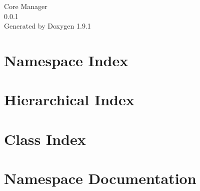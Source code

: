 \let\mypdfximage\pdfximage\def\pdfximage{\immediate\mypdfximage}\documentclass[twoside]{book}
\newcommand{\+}{\discretionary{\mbox{\scriptsize$\hookleftarrow$}}{}{}}
\newcommand{\clearemptydoublepage}{%
  \newpage{\pagestyle{empty}\cleardoublepage}%
}
\begin{document}
\raggedbottom

\begin{titlepage}
\vspace*{7cm}
\begin{center}%
{\Large Core Manager \\[1ex]\large 0.\+0.\+1 }\\
\vspace*{1cm}
{\large Generated by Doxygen 1.9.1}\\
\end{center}
\end{titlepage}
\clearemptydoublepage
{}
\tableofcontents
\clearemptydoublepage
{}

\chapter{Namespace Index}

\chapter{Hierarchical Index}

\chapter{Class Index}

\chapter{Namespace Documentation}































\end{document}
